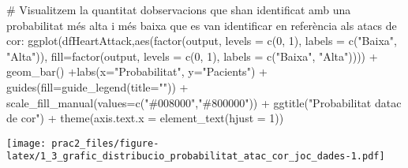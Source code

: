\documentclass[
]{article}
\newenvironment{Shaded}{\begin{snugshade}}{\end{snugshade}}
\newcommand{\AttributeTok}[1]{\textcolor[rgb]{0.80,0.80,0.80}{#1}}
\newcommand{\CommentTok}[1]{\textcolor[rgb]{0.50,0.62,0.50}{#1}}
\newcommand{\DecValTok}[1]{\textcolor[rgb]{0.86,0.86,0.80}{#1}}
\newcommand{\FunctionTok}[1]{\textcolor[rgb]{0.94,0.94,0.56}{#1}}
\newcommand{\NormalTok}[1]{\textcolor[rgb]{0.80,0.80,0.80}{#1}}
\newcommand{\SpecialCharTok}[1]{\textcolor[rgb]{0.86,0.64,0.64}{#1}}
\newcommand{\StringTok}[1]{\textcolor[rgb]{0.80,0.58,0.58}{#1}}
\begin{document}
\begin{Shaded}
\begin{Highlighting}[]
\CommentTok{\# Visualitzem la quantitat d\textquotesingle{}observacions que s\textquotesingle{}han identificat amb una probabilitat més alta i més baixa que es van identificar en  referència als atacs de cor:}
\FunctionTok{ggplot}\NormalTok{(dfHeartAttack,}\FunctionTok{aes}\NormalTok{(}\FunctionTok{factor}\NormalTok{(output, }\AttributeTok{levels =} \FunctionTok{c}\NormalTok{(}\DecValTok{0}\NormalTok{, }\DecValTok{1}\NormalTok{), }\AttributeTok{labels =} \FunctionTok{c}\NormalTok{(}\StringTok{"Baixa"}\NormalTok{, }\StringTok{"Alta"}\NormalTok{)), }\AttributeTok{fill=}\FunctionTok{factor}\NormalTok{(output, }\AttributeTok{levels =} \FunctionTok{c}\NormalTok{(}\DecValTok{0}\NormalTok{, }\DecValTok{1}\NormalTok{), }\AttributeTok{labels =} \FunctionTok{c}\NormalTok{(}\StringTok{"Baixa"}\NormalTok{, }\StringTok{"Alta"}\NormalTok{)))) }\SpecialCharTok{+} 
    \FunctionTok{geom\_bar}\NormalTok{() }\SpecialCharTok{+}\FunctionTok{labs}\NormalTok{(}\AttributeTok{x=}\StringTok{"Probabilitat"}\NormalTok{, }\AttributeTok{y=}\StringTok{"Pacients"}\NormalTok{) }\SpecialCharTok{+} 
        \FunctionTok{guides}\NormalTok{(}\AttributeTok{fill=}\FunctionTok{guide\_legend}\NormalTok{(}\AttributeTok{title=}\StringTok{""}\NormalTok{)) }\SpecialCharTok{+} 
        \FunctionTok{scale\_fill\_manual}\NormalTok{(}\AttributeTok{values=}\FunctionTok{c}\NormalTok{(}\StringTok{"\#008000"}\NormalTok{,}\StringTok{"\#800000"}\NormalTok{)) }\SpecialCharTok{+} 
        \FunctionTok{ggtitle}\NormalTok{(}\StringTok{"Probabilitat d\textquotesingle{}atac de cor"}\NormalTok{) }\SpecialCharTok{+}
    \FunctionTok{theme}\NormalTok{(}\AttributeTok{axis.text.x =} \FunctionTok{element\_text}\NormalTok{(}\AttributeTok{hjust =} \DecValTok{1}\NormalTok{))}
\end{Highlighting}
\end{Shaded}

\texttt{[image: prac2\_files/figure-latex/1\_3\_grafic\_distribucio\_probabilitat\_atac\_cor\_joc\_dades-1.pdf]}

\begin{Shaded}
\end{Shaded}
\end{document}
